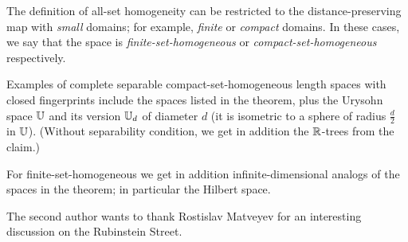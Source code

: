 \documentclass[a4paper,10pt]{article}
\begin{document}
The definition of all-set homogeneity can be restricted to the distance-preserving map with \emph{small} domains; for example, \emph{finite} or \emph{compact} domains.
In these cases, we say that the space is \emph{finite-set-homogeneous} or \emph{compact-set-homogeneous} respectively.

Examples of complete separable compact-set-homogeneous length spaces with closed fingerprints include the spaces listed in the theorem,
plus the Urysohn space $\mathbb{U}$ and its version $\mathbb{U}_d$ of diameter $d$ (it is isometric to a sphere of radius $\tfrac d2$ in $\mathbb{U}$).
(Without separability condition, we get in addition the $\mathbb{R}$-trees from the claim.)

For finite-set-homogeneous we get in addition infinite-dimensional analogs of the spaces in the theorem;
in particular the Hilbert space.

The second author wants to thank Rostislav Matveyev for an interesting discussion on the Rubinstein Street. 


{\sloppy
\printbibliography[heading=bibintoc]
\fussy
}
\end{document}

